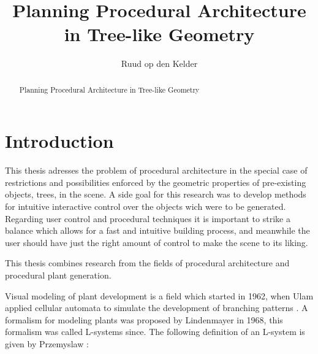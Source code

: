 \documentclass{article}
\title{Planning Procedural Architecture in Tree-like Geometry}
\author{Ruud op den Kelder}
\begin{document}
\maketitle

\begin{abstract}
Planning Procedural Architecture in Tree-like Geometry
\end{abstract}
\newpage 

\tableofcontents
\newpage 

\section{Introduction}


This thesis adresses the problem of procedural architecture in the special case of restrictions and possibilities enforced by the geometric properties of pre-existing objects, trees, in the scene. A side goal for this research was to develop methods for intuitive interactive control over the objects wich were to be generated. Regarding user control and procedural techniques it is important to strike a balance which allows for a fast and intuitive building process, and meanwhile the user should have just the right amount of control to make the scene to its liking.

This thesis combines research from the fields of procedural architecture and procedural plant generation.


Visual modeling of plant development is a field which started in 1962, when Ulam applied cellular automata to 
simulate the development of branching patterns \cite{PrzemyslawPlants}. A formalism for modeling plants was proposed by Lindenmayer 
in 1968, this formalism was called L-systems since. The following definition of an L-system is given by Przemyslaw \cite{PrzemyslawPlants}: 
\end{document}
